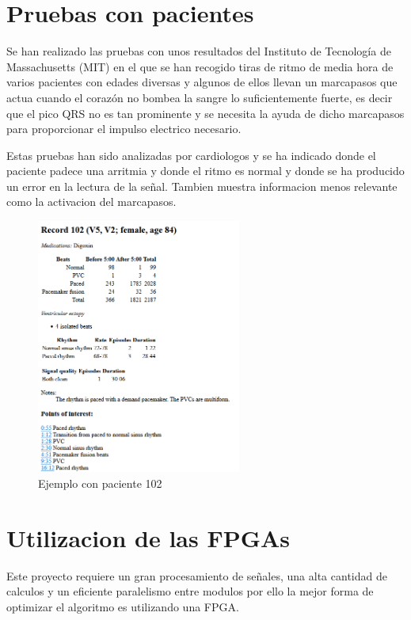 \section{Pruebas con pacientes}
Se han realizado las pruebas con unos resultados del Instituto de Tecnología de Massachusetts (MIT) en el que se han
recogido tiras de ritmo de media hora de varios pacientes con edades diversas y algunos de ellos llevan un marcapasos
que actua cuando el corazón no bombea la sangre lo suficientemente fuerte, es decir que el pico QRS no es tan prominente
y se necesita la ayuda de dicho marcapasos para proporcionar el impulso electrico necesario.

Estas pruebas han sido analizadas por cardiologos y se ha indicado donde el paciente padece una arritmia y donde el ritmo
es normal y donde se ha producido un error en la lectura de la señal. Tambien muestra informacion menos relevante como la 
activacion del marcapasos.

\begin{figure}[h]
	\centering
	\includegraphics[width=0.6\textwidth]{./Images/img_introduccion/Paciente_pruebas_MIT.png}
	\caption{Ejemplo con paciente 102}
	\label{fig:Paciente_pruebas_MIT}
\end{figure}

\section{Utilizacion de las FPGAs}
Este proyecto requiere un gran procesamiento de señales, una alta cantidad de calculos y un eficiente paralelismo 
entre modulos por ello la mejor forma de optimizar el algoritmo es utilizando una FPGA.

